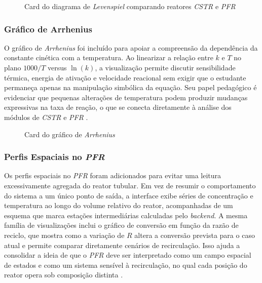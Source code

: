 \begin{figure}[H]
    \centering
    \caption{Card do diagrama de \textit{Levenspiel} comparando reatores \textit{CSTR} e \textit{PFR}}
    \label{fig:viz_levenspiel}
\end{figure}

\subsubsection{Gráfico de Arrhenius}

O gráfico de \textit{Arrhenius} foi incluído para apoiar a compreensão da dependência da constante cinética com a temperatura. Ao linearizar a relação entre $k$ e $T$ no plano $1000/T$ versus $\ln(k)$, a visualização permite discutir sensibilidade térmica, energia de ativação e velocidade reacional sem exigir que o estudante permaneça apenas na manipulação simbólica da equação. Seu papel pedagógico é evidenciar que pequenas alterações de temperatura podem produzir mudanças expressivas na taxa de reação, o que se conecta diretamente à análise dos módulos de \textit{CSTR} e \textit{PFR} \cite{fogler2009}.

\begin{figure}[H]
    \centering
    \caption{Card do gráfico de \textit{Arrhenius}}
    \label{fig:viz_arrhenius}
\end{figure}

\subsubsection{Perfis Espaciais no \textit{PFR}}

Os perfis espaciais no \textit{PFR} foram adicionados para evitar uma leitura excessivamente agregada do reator tubular. Em vez de resumir o comportamento do sistema a um único ponto de saída, a interface exibe séries de concentração e temperatura ao longo do volume relativo do reator, acompanhadas de um esquema que marca estações intermediárias calculadas pelo \textit{backend}. A mesma família de visualizações inclui o gráfico de conversão em função da razão de reciclo, que mostra como a variação de $R$ altera a conversão prevista para o caso atual e permite comparar diretamente cenários de recirculação. Isso ajuda a consolidar a ideia de que o \textit{PFR} deve ser interpretado como um campo espacial de estados e como um sistema sensível à recirculação, no qual cada posição do reator opera sob composição distinta \cite{fogler2009,levenspiel2000}.


